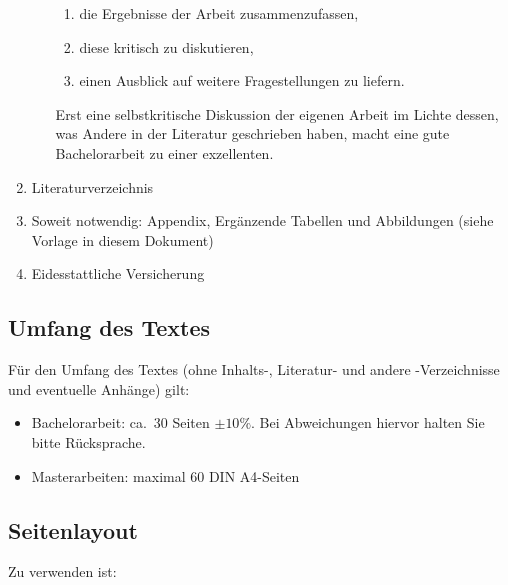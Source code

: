 \documentclass[a4paper,12pt]{scrartcl} %
\begin{document}
\begin{enumerate}
\begin{itemize}
\begin{enumerate}[label=\roman*.]
        \item die Ergebnisse der Arbeit zusammenzufassen,
        \item diese kritisch zu diskutieren,
        \item einen Ausblick auf weitere Fragestellungen zu liefern.
    \end{enumerate}
    Erst eine selbstkritische Diskussion der eigenen Arbeit im Lichte dessen, was Andere in der Literatur geschrieben haben, macht eine gute Bachelorarbeit zu einer exzellenten.
	\end{itemize}
\item Literaturverzeichnis	
\item Soweit notwendig: Appendix, Ergänzende Tabellen und Abbildungen (siehe Vorlage in diesem Dokument)
\item Eidesstattliche Versicherung
\end{enumerate}

\subsection{Umfang des Textes}
Für den Umfang des Textes (ohne Inhalts-, Literatur- und andere
-Verzeichnisse und eventuelle Anhänge) gilt:

\begin{itemize}
\item Bachelorarbeit: ca.\ 30 Seiten $\pm 10\%$. Bei Abweichungen hiervor halten Sie bitte Rücksprache.

\item Masterarbeiten: maximal 60 DIN A4-Seiten
\end{itemize}

\subsection{Seitenlayout}
Zu verwenden ist:
\end{document}
